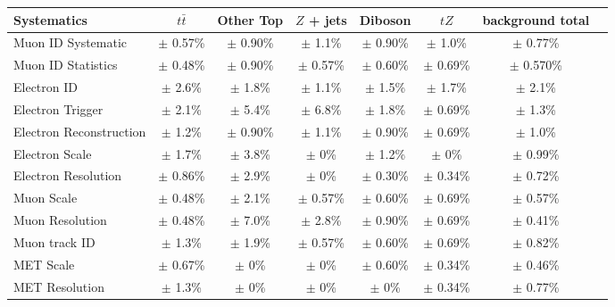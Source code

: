 \begin{table} [ht!]
\setlength{\tabcolsep}{2pt}
\footnotesize
\centering
\begin{tabular}{| l | c | c | c | c | c | c | c |}
\hline
\hline
Systematics & $t\bar{t}$ & Other Top & $Z$ + jets & Diboson & $tZ$ & background total \\
\hline
\hline


Muon ID Systematic & $\pm $ 0.57\% & $\pm $ 0.90\% & $\pm $ 1.1\% & $\pm $ 0.90\% & $\pm $ 1.0\% & $\pm $ 0.77\% \\
\hline

Muon ID Statistics & $\pm $ 0.48\% & $\pm $ 0.90\% & $\pm $ 0.57\% & $\pm $ 0.60\% & $\pm $ 0.69\% & $\pm $ 0.570\% \\
\hline

Electron ID & $\pm $ 2.6\% & $\pm $ 1.8\% & $\pm $ 1.1\% & $\pm $ 1.5\% & $\pm $ 1.7\% & $\pm $ 2.1\% \\
\hline

Electron Trigger & $\pm $ 2.1\% & $\pm $ 5.4\% & $\pm $ 6.8\% & $\pm $ 1.8\% & $\pm $ 0.69\% & $\pm $ 1.3\% \\
\hline

Electron Reconstruction & $\pm $ 1.2\% & $\pm $ 0.90\% & $\pm $ 1.1\% & $\pm $ 0.90\% & $\pm $ 0.69\% & $\pm $ 1.0\% \\
\hline

Electron Scale & $\pm $ 1.7\% & $\pm $ 3.8\% & $\pm $ 0\% & $\pm $ 1.2\% & $\pm $ 0\% & $\pm $ 0.99\% \\
\hline

Electron Resolution & $\pm $ 0.86\% & $\pm $ 2.9\% & $\pm $ 0\% & $\pm $ 0.30\% & $\pm $ 0.34\% & $\pm $ 0.72\% \\
\hline

Muon Scale & $\pm $ 0.48\% & $\pm $ 2.1\% & $\pm $ 0.57\% & $\pm $ 0.60\% & $\pm $ 0.69\% & $\pm $ 0.57\% \\
\hline
Muon Resolution & $\pm $ 0.48\% & $\pm $ 7.0\% & $\pm $ 2.8\% & $\pm $ 0.90\% & $\pm $ 0.69\% & $\pm $ 0.41\% \\
\hline
Muon track ID & $\pm $ 1.3\% & $\pm $ 1.9\% & $\pm $ 0.57\% & $\pm $ 0.60\% & $\pm $ 0.69\% & $\pm $ 0.82\% \\
\hline

MET Scale & $\pm $ 0.67\% & $\pm $ 0\% & $\pm $ 0\% & $\pm $ 0.60\% & $\pm $ 0.34\% & $\pm $ 0.46\% \\
\hline
MET Resolution & $\pm $ 1.3\% & $\pm $ 0\% & $\pm $ 0\% & $\pm $ 0\% & $\pm $ 0.34\% & $\pm $ 0.77\% \\
\hline


\end{tabular}
\end{table}
